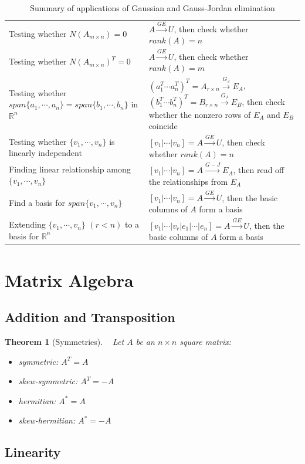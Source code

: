 \documentclass[]{article}
\newtheorem{theo}{Theorem}
\newenvironment{definition}[2][Definition]{\begin{trivlist}
\item[\hskip \labelsep {\bfseries #1}\hskip \labelsep {\bfseries #2.}]}{\end{trivlist}}
\begin{document}
\begin{table}[H]
\begin{tabularx}{\textwidth}{X|X}
Testing whether $N(A_{m\times n})={0}$ & $A\xrightarrow{GE}U$, then check whether $rank(A)=n$ \\
Testing whether $N(A_{m\times n})^T={0}$ & $A\xrightarrow{GE}U$, then check whether $rank(A)=m$ \\
Testing whether $span\{a_1,\cdots ,a_n\}=span\{b_1,\cdots ,b_n\}$ in $\mathbb{R}^n$ & $(a_1^T \cdots a_n^T)^T=A_{r\times n}\xrightarrow{G_J}E_A$, $(b_1^T \cdots b_n^T)^T=B_{r\times n}\xrightarrow{G_J}E_B$, then check whether the nonzero rows of $E_A$ and $E_B$ coincide \\
Testing whether $\{v_1,\cdots ,v_n\}$ is linearly independent & $[v_1|\cdots |v_n]=A\xrightarrow{GE}U$, then check whether $rank(A)=n$\\
Finding linear relationship among $\{v_1,\cdots ,v_n\}$ & $[v_1|\cdots |v_n]=A\xrightarrow{G-J}E_A$, then read off the relationships from $E_A$ \\
Find a basis for $span\{v_1,\cdots ,v_n \}$ & $[v_1|\cdots |v_n]=A\xrightarrow{GE}U$, then the basic columns of $A$ form a basis\\
Extending $\{v_1,\cdots ,v_n\}$ $(r<n)$ to a basis for $\mathbb{R}^n$ & $[v_1|\cdots |v_r|e_1|\cdots |e_n]=A\xrightarrow{GE}U$, then the basic columns of $A$ form a basis
\end{tabularx}
\caption{Summary of applications of Gaussian and Gauss-Jordan elimination}
\end{table}
\pagebreak

\section{Matrix Algebra}
\subsection{Addition and Transposition}
\begin{theo}[Symmetries]
~ Let $A$ be an $n\times n$ square matrix:
\begin{itemize}
\item symmetric: $A^T=A$
\item skew-symmetric: $A^T=-A$
\item hermitian: $A^*=A$
\item skew-hermitian: $A^*=-A$
\end{itemize}
\end{theo}

\subsection{Linearity}
\end{document}
